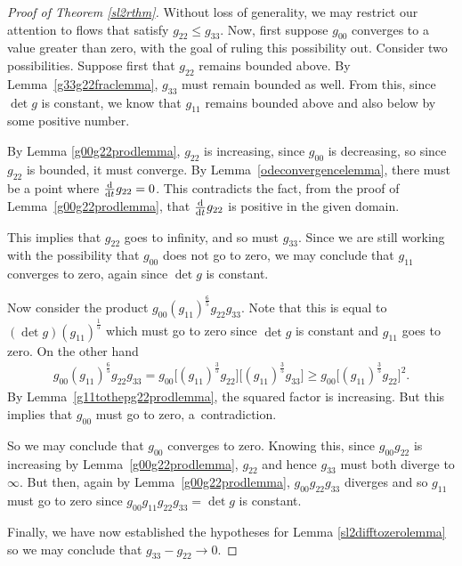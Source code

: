 \documentclass[pdftex]{sigma}
\numberwithin{equation}{section}
\newcommand{\dtime}{\frac{{\rm d}}{{\rm d} t}} %
\begin{document}
\begin{proof}[Proof of Theorem \ref{sl2rthm}]
Without loss of generality, we may restrict our attention to flows that satisfy $g_{22} \leq g_{33}$. Now, first suppose $g_{00}$ converges to a value greater than zero, with the goal of ruling this possibility out. Consider two possibilities. Suppose first that $g_{22}$ remains bounded above. By Lemma~\ref{g33g22fraclemma}, $g_{33}$ must remain bounded as well. From this, since $\det g$ is constant, we know that $g_{11}$ remains bounded above and also below by some positive number.

By Lemma \ref{g00g22prodlemma}, $g_{22}$ is increasing, since $g_{00}$ is decreasing, so since $g_{22}$ is bounded, it must converge. By Lemma~\ref{odeconvergencelemma}, there must be a point where $\dtime g_{22} = 0$. This contradicts the fact, from the proof of Lemma~\ref{g00g22prodlemma}, that $\dtime g_{22}$ is positive in the given domain.

This implies that $g_{22}$ goes to infinity, and so must $g_{33}$. Since we are still working with the possibility that $g_{00}$ does not go to zero, we may conclude that $g_{11}$ converges to zero, again since $\det g$ is constant.

Now consider the product $g_{00} (g_{11})^{\frac{6}{5}} g_{22} g_{33}$. Note that this is equal to $(\det g)(g_{11})^{\frac{1}{5}}$ which must go to zero since $\det g$ is constant and $g_{11}$ goes to zero. On the other hand
\begin{gather*}
g_{00} (g_{11})^{\frac{6}{5}} g_{22} g_{33} = g_{00} \big[(g_{11})^{\frac{3}{5}}g_{22}\big] \big[(g_{11})^{\frac{3}{5}}g_{33}\big] \geq g_{00} \big[(g_{11})^{\frac{3}{5}}g_{22}\big]^2.
\end{gather*}
By Lemma~\ref{g11tothepg22prodlemma}, the squared factor is increasing. But this implies that $g_{00}$ must go to zero, a~contradiction.

So we may conclude that $g_{00}$ converges to zero. Knowing this, since $g_{00} g_{22}$ is increasing by Lemma~\ref{g00g22prodlemma}, $g_{22}$ and hence $g_{33}$ must both diverge to $\infty$. But then, again by Lemma~\ref{g00g22prodlemma}, $g_{00} g_{22} g_{33}$ diverges and so $g_{11}$ must go to zero since $g_{00} g_{11} g_{22} g_{33} = \det g$ is constant.

Finally, we have now established the hypotheses for Lemma \ref{sl2difftozerolemma} so we may conclude that $g_{33} - g_{22} \rightarrow 0$.
\end{proof}
\end{document}
